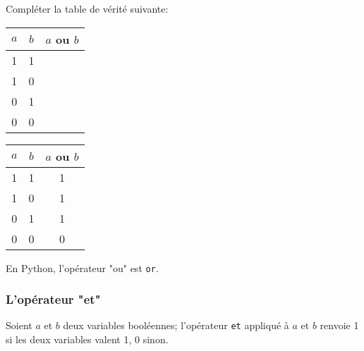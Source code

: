 \documentclass[12pt]{article}
\begin{document}
	\begin{MonExo}
		Compléter la table de vérité suivante:
		\\
		
		\begin{center}		
			\begin{tabular}{|c|c|c|}
				\hline
				$a$ & $b$ & $a$ ou $b$ \\ \hline
				1 & 1 &  \\ \hline
				1 & 0 &  \\ \hline
				0 & 1 &  \\ \hline
				0 & 0 &  \\ \hline
			\end{tabular}
		\end{center}
	\end{MonExo}
	\begin{MaReponse}
		\begin{center}		
			\begin{tabular}{|c|c|c|}
				\hline
				$a$ & $b$ & $a$ ou $b$ \\ \hline
				1 & 1 & 1 \\ \hline
				1 & 0 & 1 \\ \hline
				0 & 1 & 1 \\ \hline
				0 & 0 & 0 \\ \hline
			\end{tabular}
		\end{center}
	\end{MaReponse}
	
	En Python, l'opérateur "ou" est \texttt{or}.
	
	\subsubsection*{L'opérateur "et"}
	Soient $a$ et $b$ deux variables booléennes; l'opérateur \texttt{et} appliqué à $a$ et $b$ renvoie 1 si les deux variables valent 1, 0 sinon.
	
\end{document}
